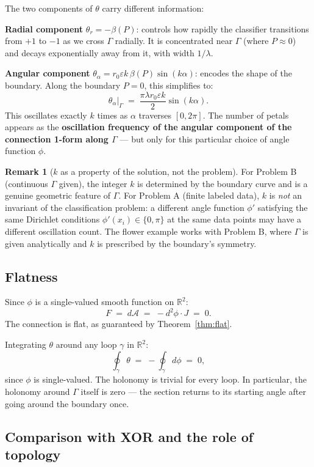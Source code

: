 \documentclass[11pt, a4paper]{article}
\theoremstyle{plain}
\theoremstyle{definition}
\newtheorem{remark}[theorem]{Remark}
\newcommand{\R}{\mathbb{R}}
\newcommand{\Sig}{\mathcal{A}}
\newcommand{\Gam}{\Gamma}
\begin{document}
The two components of $\theta$ carry different information:

\textbf{Radial component} $\theta_r = -\beta(P)$: controls how rapidly the
classifier transitions from $+1$ to $-1$ as we cross $\Gam$ radially. It is
concentrated near $\Gam$ (where $P \approx 0$) and decays exponentially away
from it, with width $1/\lambda$.

\textbf{Angular component} $\theta_\alpha = r_0\varepsilon k\,\beta(P)\sin(k\alpha)$:
encodes the shape of the boundary. Along the boundary $P = 0$, this simplifies to:
\[
  \theta_\alpha\big|_{\Gam} \;=\; \frac{\pi\lambda r_0\varepsilon k}{2}\sin(k\alpha).
\]
This oscillates exactly $k$ times as $\alpha$ traverses $[0,2\pi]$. The number
of petals appears as the \textbf{oscillation frequency of the angular component
of the connection 1-form along $\Gam$} --- but only for this particular choice
of angle function $\phi$.

\begin{remark}[$k$ as a property of the solution, not the problem]
For Problem B (continuous $\Gam$ given), the integer $k$ is determined by the
boundary curve and is a genuine geometric feature of $\Gam$. For Problem A
(finite labeled data), $k$ is \emph{not} an invariant of the classification
problem: a different angle function $\phi'$ satisfying the same Dirichlet
conditions $\phi'(x_i) \in \{0,\pi\}$ at the same data points may have a
different oscillation count. The flower example works with Problem B, where
$\Gam$ is given analytically and $k$ is prescribed by the boundary's symmetry.
\end{remark}

\subsection{Flatness}

Since $\phi$ is a single-valued smooth function on $\R^2$:
\[
  F \;=\; d\Sig \;=\; -d^2\phi\cdot J \;=\; 0.
\]
The connection is flat, as guaranteed by Theorem~\ref{thm:flat}.

Integrating $\theta$ around any loop $\gamma$ in $\R^2$:
\[
  \oint_\gamma \theta \;=\; -\oint_\gamma d\phi \;=\; 0,
\]
since $\phi$ is single-valued. The holonomy is trivial for every loop. In
particular, the holonomy around $\Gam$ itself is zero --- the section returns
to its starting angle after going around the boundary once.

\subsection{Comparison with XOR and the role of topology}
\end{document}
